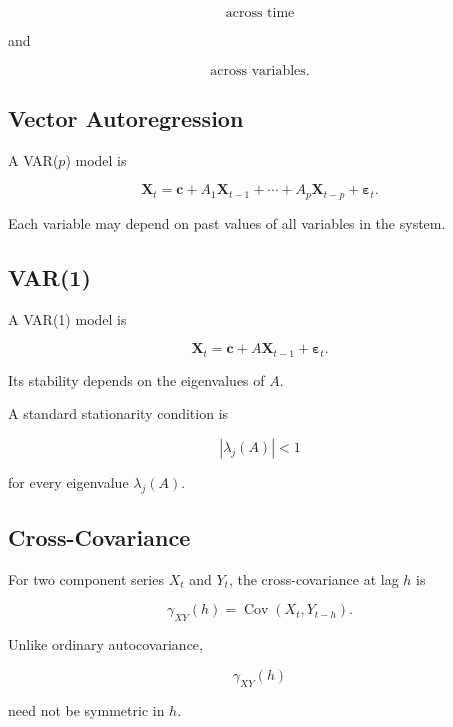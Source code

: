 \[
\boxed{
\text{across time}
}
\]

and

\[
\boxed{
\text{across variables}.
}
\]

\subsection{Vector Autoregression}
\label{subsec:vector-autoregression}

A VAR(\(p\)) model is

\[
\boxed{
\mathbf{X}_t
=
\mathbf{c}
+
A_1
\mathbf{X}_{t-1}
+
\cdots
+
A_p
\mathbf{X}_{t-p}
+
\boldsymbol{\varepsilon}_t.
}
\]

Each variable may depend on past values of all variables in the system.

\subsection{VAR(1)}
\label{subsec:var1}

A VAR(1) model is

\[
\boxed{
\mathbf{X}_t
=
\mathbf{c}
+
A
\mathbf{X}_{t-1}
+
\boldsymbol{\varepsilon}_t.
}
\]

Its stability depends on the eigenvalues of \(A\).

A standard stationarity condition is

\[
\boxed{
|\lambda_j(A)|<1
}
\]

for every eigenvalue \(\lambda_j(A)\).

\subsection{Cross-Covariance}
\label{subsec:cross-covariance-time-series}

For two component series \(X_t\) and \(Y_t\), the cross-covariance at lag
\(h\) is

\[
\boxed{
\gamma_{XY}(h)
=
\operatorname{Cov}
(
X_t,
Y_{t-h}
).
}
\]

Unlike ordinary autocovariance,

\[
\gamma_{XY}(h)
\]

need not be symmetric in \(h\).

